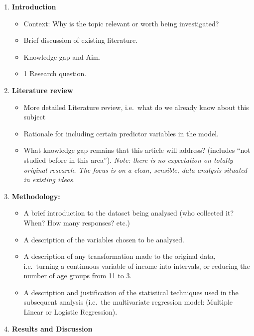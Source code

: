 \documentclass[
  letterpaper,
  DIV=11,
  numbers=noendperiod]{scrreprt}
\providecommand{\tightlist}{%
  \setlength{\itemsep}{0pt}\setlength{\parskip}{0pt}}
\begin{document}
\begin{enumerate}
\def\labelenumi{\arabic{enumi}.}
\tightlist
\item
  \textbf{Introduction}

  \begin{itemize}
  \tightlist
  \item
    Context: Why is the topic relevant or worth being investigated?
  \item
    Brief discussion of existing literature.
  \item
    Knowledge gap and Aim.
  \item
    1 Research question.
  \end{itemize}
\item
  \textbf{Literature review}

  \begin{itemize}
  \tightlist
  \item
    More detailed Literature review, i.e.~what do we already know about
    this subject
  \item
    Rationale for including certain predictor variables in the model.
  \item
    What knowledge gap remains that this article will address? (includes
    ``not studied before in this area''). \emph{Note: there is no
    expectation on totally original research. The focus is on a clean,
    sensible, data analysis situated in existing ideas.}
  \end{itemize}
\item
  \textbf{Methodology:}

  \begin{itemize}
  \tightlist
  \item
    A brief introduction to the dataset being analysed (who collected
    it? When? How many responses? etc.)
  \item
    A description of the variables chosen to be analysed.
  \item
    A description of any transformation made to the original data,
    i.e.~turning a continuous variable of income into intervals, or
    reducing the number of age groups from 11 to 3.
  \item
    A description and justification of the statistical techniques used
    in the subsequent analysis (i.e.~the multivariate regression model:
    Multiple Linear or Logistic Regression).
  \end{itemize}
\item
  \textbf{Results and Discussion}


\end{enumerate}
\end{document}
